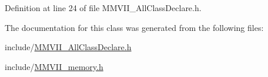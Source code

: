 Definition at line 24 of file M\+M\+V\+I\+I\+\_\+\+All\+Class\+Declare.\+h.



The documentation for this class was generated from the following files\+:\begin{DoxyCompactItemize}
\item 
include/\hyperlink{MMVII__AllClassDeclare_8h}{M\+M\+V\+I\+I\+\_\+\+All\+Class\+Declare.\+h}\item 
include/\hyperlink{MMVII__memory_8h}{M\+M\+V\+I\+I\+\_\+memory.\+h}\end{DoxyCompactItemize}
